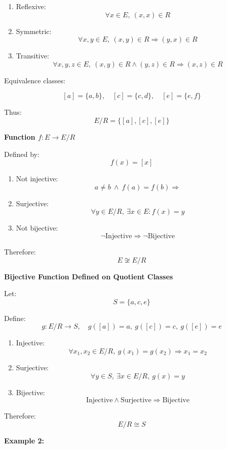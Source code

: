 \documentclass[12pt,a4paper,openany]{article}
\begin{document}
\begin{enumerate}
\item Reflexive:
$$
\forall x \in E,\ (x,x) \in R
$$

\item Symmetric:
$$
\forall x,y \in E,\ (x,y) \in R \Rightarrow (y,x) \in R
$$

\item Transitive:
$$
\forall x,y,z \in E,\ (x,y) \in R \wedge (y,z) \in R \Rightarrow (x,z) \in R
$$
\end{enumerate}

Equivalence classes:

$$
[a] = \{a,b\}, \quad [c] = \{c,d\}, \quad [e] = \{e,f\}
$$

Thus:
$$
E/R = \{[a], [c], [e]\}
$$

\textbf{Function $f: E \to E/R$}

Defined by:
$$
f(x) = [x]
$$

\begin{enumerate}
\item Not injective:
$$
a \ne b \ \wedge\ f(a) = f(b) \Rightarrow 
$$

\item Surjective:
$$
\forall y \in E/R,\ \exists x \in E: f(x) = y 
$$

\item Not bijective:
$$
\neg \text{Injective} \Rightarrow \neg \text{Bijective}
$$
\end{enumerate}

Therefore:
$$
E \not\cong E/R
$$

\textbf{Bijective Function Defined on Quotient Classes}

Let:
$$
S = \{a,c,e\}
$$

Define:
$$
g: E/R \to S,\quad g([a]) = a,\ g([c]) = c,\ g([e]) = e
$$

\begin{enumerate}
\item Injective:
$$
\forall x_1,x_2 \in E/R,\ g(x_1) = g(x_2) \Rightarrow x_1 = x_2
$$

\item Surjective:
$$
\forall y \in S,\ \exists x \in E/R,\ g(x) = y
$$

\item Bijective:
$$
\text{Injective} \wedge \text{Surjective} \Rightarrow \text{Bijective}
$$
\end{enumerate}

Therefore:
$$
E/R \cong S
$$

\textbf{Example 2:}
\end{document}
